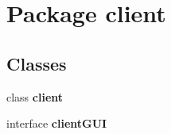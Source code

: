 \section{Package client}
\label{namespaceclient}
\subsection*{Classes}
\begin{DoxyCompactItemize}
\item 
class {\bf client}
\item 
interface {\bf client\-G\-U\-I}
\end{DoxyCompactItemize}
